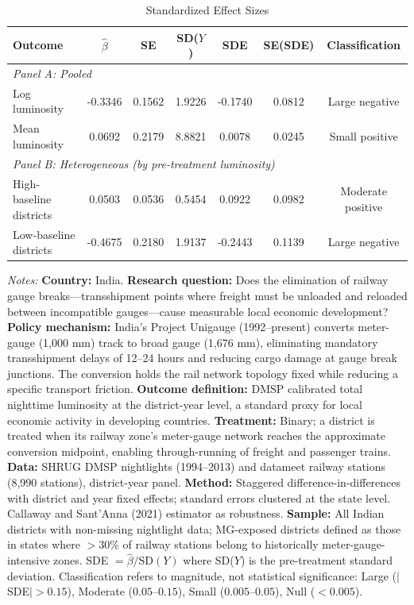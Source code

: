 \begin{table}[htbp]
\centering
\begin{threeparttable}
\caption{Standardized Effect Sizes}
\label{tab:sde}
\begin{tabular}{lcccccc}
\hline\hline
Outcome & $\hat{\beta}$ & SE & SD($Y$) & SDE & SE(SDE) & Classification \\
\hline
\multicolumn{7}{l}{\textit{Panel A: Pooled}} \\
Log luminosity & -0.3346 & 0.1562 & 1.9226 & -0.1740 & 0.0812 & Large negative \\
Mean luminosity & 0.0692 & 0.2179 & 8.8821 & 0.0078 & 0.0245 & Small positive \\
\hline
\multicolumn{7}{l}{\textit{Panel B: Heterogeneous (by pre-treatment luminosity)}} \\
High-baseline districts & 0.0503 & 0.0536 & 0.5454 & 0.0922 & 0.0982 & Moderate positive \\
Low-baseline districts & -0.4675 & 0.2180 & 1.9137 & -0.2443 & 0.1139 & Large negative \\
\hline\hline
\end{tabular}
\begin{tablenotes}[flushleft]
\small
\item \textit{Notes:} \textbf{Country:} India. \textbf{Research question:} Does the elimination of railway gauge breaks---transshipment points where freight must be unloaded and reloaded between incompatible gauges---cause measurable local economic development? \textbf{Policy mechanism:} India's Project Unigauge (1992--present) converts meter-gauge (1,000 mm) track to broad gauge (1,676 mm), eliminating mandatory transshipment delays of 12--24 hours and reducing cargo damage at gauge break junctions. The conversion holds the rail network topology fixed while reducing a specific transport friction. \textbf{Outcome definition:} DMSP calibrated total nighttime luminosity at the district-year level, a standard proxy for local economic activity in developing countries. \textbf{Treatment:} Binary; a district is treated when its railway zone's meter-gauge network reaches the approximate conversion midpoint, enabling through-running of freight and passenger trains. \textbf{Data:} SHRUG DMSP nightlights (1994--2013) and datameet railway stations (8,990 stations), district-year panel. \textbf{Method:} Staggered difference-in-differences with district and year fixed effects; standard errors clustered at the state level. Callaway and Sant'Anna (2021) estimator as robustness. \textbf{Sample:} All Indian districts with non-missing nightlight data; MG-exposed districts defined as those in states where $>$30\% of railway stations belong to historically meter-gauge-intensive zones. SDE $= \hat{\beta} / \text{SD}(Y)$ where SD($Y$) is the pre-treatment standard deviation. Classification refers to magnitude, not statistical significance: Large ($|$SDE$| > 0.15$), Moderate ($0.05$--$0.15$), Small ($0.005$--$0.05$), Null ($< 0.005$).
\end{tablenotes}
\end{threeparttable}
\end{table}

